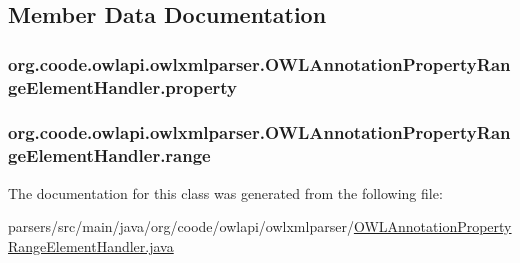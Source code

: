 \subsection{Member Data Documentation}
\hypertarget{classorg_1_1coode_1_1owlapi_1_1owlxmlparser_1_1_o_w_l_annotation_property_range_element_handler_a49a2d40660f2820d5e69a115cd5767c5}{
\subsubsection[{property}]{ org.\-coode.\-owlapi.\-owlxmlparser.\-O\-W\-L\-Annotation\-Property\-Range\-Element\-Handler.\-property\hspace{0.3cm}{\ttfamily [private]}}}\label{classorg_1_1coode_1_1owlapi_1_1owlxmlparser_1_1_o_w_l_annotation_property_range_element_handler_a49a2d40660f2820d5e69a115cd5767c5}
\hypertarget{classorg_1_1coode_1_1owlapi_1_1owlxmlparser_1_1_o_w_l_annotation_property_range_element_handler_a68cacf34be8dfcf18e44a0a47ae68899}{
\subsubsection[{range}]{ org.\-coode.\-owlapi.\-owlxmlparser.\-O\-W\-L\-Annotation\-Property\-Range\-Element\-Handler.\-range\hspace{0.3cm}{\ttfamily [private]}}}\label{classorg_1_1coode_1_1owlapi_1_1owlxmlparser_1_1_o_w_l_annotation_property_range_element_handler_a68cacf34be8dfcf18e44a0a47ae68899}


The documentation for this class was generated from the following file\-:\begin{DoxyCompactItemize}
\item 
parsers/src/main/java/org/coode/owlapi/owlxmlparser/\hyperlink{_o_w_l_annotation_property_range_element_handler_8java}{O\-W\-L\-Annotation\-Property\-Range\-Element\-Handler.\-java}\end{DoxyCompactItemize}
